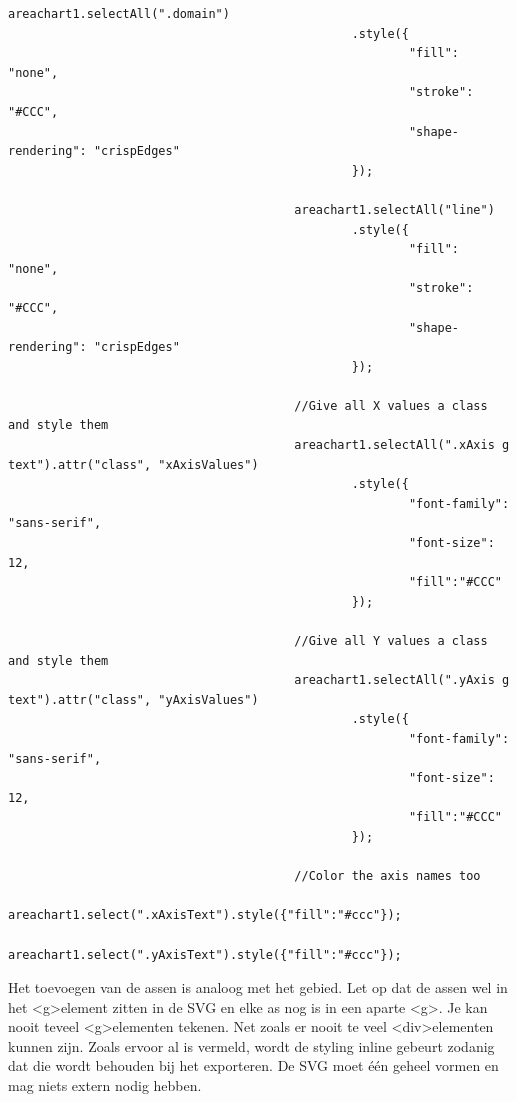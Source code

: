 \begin{lstlisting}[gobble=24]
                                        areachart1.selectAll(".domain")
                                                .style({
                                                        "fill": "none",
                                                        "stroke": "#CCC",
                                                        "shape-rendering": "crispEdges"
                                                });

                                        areachart1.selectAll("line")
                                                .style({
                                                        "fill": "none",
                                                        "stroke": "#CCC",
                                                        "shape-rendering": "crispEdges"
                                                });

                                        //Give all X values a class and style them
                                        areachart1.selectAll(".xAxis g text").attr("class", "xAxisValues")
                                                .style({
                                                        "font-family": "sans-serif",
                                                        "font-size": 12,
														"fill":"#CCC"
                                                });

                                        //Give all Y values a class and style them
                                        areachart1.selectAll(".yAxis g text").attr("class", "yAxisValues")
                                                .style({
                                                        "font-family": "sans-serif",
                                                        "font-size": 12,
														"fill":"#CCC"
                                                });
												
										//Color the axis names too
									areachart1.select(".xAxisText").style({"fill":"#ccc"});
									areachart1.select(".yAxisText").style({"fill":"#ccc"});

\end{lstlisting}

Het toevoegen van de assen is analoog met het gebied. Let op dat de assen wel in het \textless g\textgreater element zitten in de SVG en elke as nog is in een aparte \textless g\textgreater. Je kan nooit teveel \textless g\textgreater elementen tekenen. Net zoals er nooit te veel \textless div\textgreater elementen kunnen zijn. Zoals ervoor al is vermeld, wordt de styling inline gebeurt zodanig dat die wordt behouden bij het exporteren. De SVG moet \'e\'en geheel vormen en mag niets extern nodig hebben.

